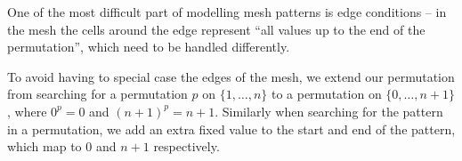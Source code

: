 \documentclass[11pt]{article}
\theoremstyle{plain}
\newtheorem{theorem}{Theorem}
\theoremstyle{definition}
\newtheorem{definition}[theorem]{Definition}
\theoremstyle{remark}
\newtheorem{remark}[theorem]{Remark}
\begin{document}
One of the most difficult part of modelling mesh patterns is edge conditions -- in the mesh the cells around the edge represent ``all values up to the end of the permutation'', which need to be handled differently.

To avoid having to special case the edges of the mesh, we extend our permutation from searching for a permutation \(p\) on \(\{1,\dots,n\}\) to a permutation on \(\{0,\dots,n+1\}\), where \(0^p=0\) and \((n+1)^p=n+1\). Similarly when searching for the pattern in a permutation, we add an extra fixed value to the start and end of the pattern, which map to \(0\) and \(n+1\) respectively.













\end{document}
